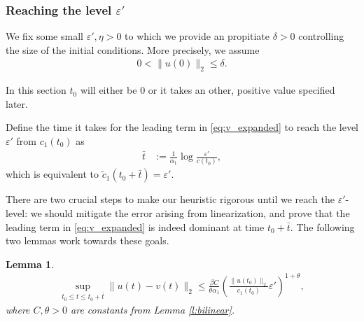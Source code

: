 \documentclass{article}
\newcommand{\1}[1]{{\mathds{1}}_{\left\{#1\right\}}}
\newtheorem{lemma}{Lemma}
\begin{document}
\subsubsection{Reaching the level $\varepsilon'$}
\label{s:varepsilon'}
   
We fix some small $\varepsilon' , \eta>0$ to which we provide an propitiate $\delta>0$ controlling the size of the initial conditions. More precisely, we assume
\begin{align*}
0<  \|u(0) \|_2 \leq \delta.
\end{align*}

In this section $t_0$ will either be $0$ or it takes an other, positive value specified later.

Define the time it takes for the leading term in \eqref{eq:v_expanded} to reach the level $\varepsilon'$ from $c_1(t_0)$ as 
\begin{align}
\label{def:t_bar}
\bar{t}&:= \frac{1}{\alpha_1}\log \frac{\varepsilon'}{c(t_0)},
\end{align}
which is equivalent to $\tilde{c}_1(t_0+\bar{t})=\varepsilon'.$   

There are two crucial steps to make our heuristic rigorous until we reach the $\varepsilon'$-level: we should mitigate the error arising from linearization, and prove that the leading term in \eqref{eq:v_expanded} is indeed dominant at time $t_0+\bar{t}.$  The following two lemmas work towards these goals.
\begin{lemma}
\label{l:linear_error}
\begin{align}
\label{eq:linear_error}
\sup_{t_0 \leq t \leq t_0+\bar{t} } \|u(t)-v(t) \|_2 \leq \frac{\beta C}{\theta\alpha_1} \left(\frac{\|u(t_0) \|_2}{c_1(t_0)} \varepsilon'\right)^{1+\theta},
\end{align}
where $C,\theta>0$ are constants from Lemma \ref{l:bilinear}.
\end{lemma}
\end{document}
